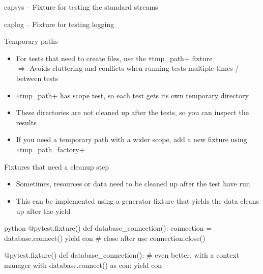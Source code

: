 \begin{frame}[c]{capsys – Fixture for testing the standard streams}
\end{frame}

\begin{frame}[c]{caplog – Fixture for testing logging}
\end{frame}

\begin{frame}[c]{Temporary paths}
  \begin{itemize}
    \item For tests that need to create files, use the \texttt+tmp_path+ fixture \\
      $⇒$ Avoids cluttering and conflicts when running tests multiple times / between tests
    \item \texttt+tmp_path+ has scope test, so each test gets its own temporary directory
    \item These directories are not cleaned up after the tests, so you can inspect the results
    \item If you need a temporary path with a wider scope, add a new fixture using \texttt+tmp_path_factory+
  \end{itemize}
\end{frame}


\begin{frame}[c, fragile]{Fixtures that need a cleanup step}
  \begin{itemize}
    \item Sometimes, resources or data need to be cleaned up after the test have run
    \item This can be implemented using a generator fixture that yields the data cleans up after the yield
  \end{itemize}

  \begin{code}{python}
    @pytest.fixture()
    def database_connection():
        connection = database.connect()
        yield con
        # close after use
        connection.close()

    @pytest.fixture()
    def database_connection():
        # even better, with a context manager
        with database.connect() as con:
            yield con
  \end{code}
\end{frame}

